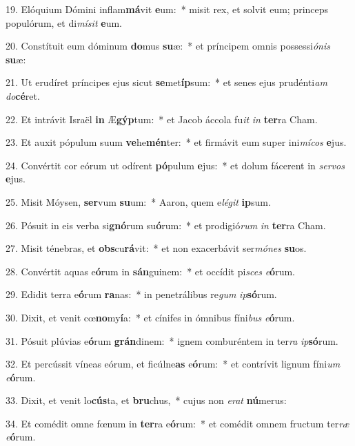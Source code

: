 19. Elóquium Dómini inflam\textbf{má}vit \textbf{e}um:~*  misit rex, et solvit eum; princeps populórum, et di\textit{mí}\textit{sit} \textbf{e}um.\

20. Constítuit eum dóminum \textbf{do}mus \textbf{su}æ:~*  et príncipem omnis possessi\textit{ó}\textit{nis} \textbf{su}æ:\

21. Ut erudíret príncipes ejus sicut \textbf{se}met\textbf{íp}sum:~*  et senes ejus prudénti\textit{am} \textit{do}\textbf{cé}ret.\

22. Et intrávit Israël \textbf{in} Æ\textbf{gýp}tum:~*  et Jacob áccola fu\textit{it} \textit{in} \textbf{ter}ra Cham.\

23. Et auxit pópulum suum \textbf{ve}he\textbf{mén}ter:~*  et firmávit eum super ini\textit{mí}\textit{cos} \textbf{e}jus.\

24. Convértit cor eórum ut odírent \textbf{pó}pulum \textbf{e}jus:~*  et dolum fácerent in \textit{ser}\textit{vos} \textbf{e}jus.\

25. Misit Móysen, \textbf{ser}vum \textbf{su}um:~*  Aaron, quem e\textit{lé}\textit{git} \textbf{ip}sum.\

26. Pósuit in eis verba si\textbf{gnó}rum su\textbf{ó}rum:~*  et prodigió\textit{rum} \textit{in} \textbf{ter}ra Cham.\

27. Misit ténebras, et \textbf{obs}cu\textbf{rá}vit:~*  et non exacerbávit ser\textit{mó}\textit{nes} \textbf{su}os.\

28. Convértit aquas e\textbf{ó}rum in \textbf{sán}guinem:~*  et occídit pi\textit{sces} \textit{e}\textbf{ó}rum.\

29. Edidit terra e\textbf{ó}rum \textbf{ra}nas:~*  in penetrálibus re\textit{gum} \textit{ip}\textbf{só}rum.\

30. Dixit, et venit cœ\textbf{no}my\textbf{í}a:~*  et cínifes in ómnibus fíni\textit{bus} \textit{e}\textbf{ó}rum.\

31. Pósuit plúvias e\textbf{ó}rum \textbf{grán}dinem:~*  ignem comburéntem in ter\textit{ra} \textit{ip}\textbf{só}rum.\

32. Et percússit víneas eórum, et ficúlne\textbf{as} e\textbf{ó}rum:~*  et contrívit lignum fíni\textit{um} \textit{e}\textbf{ó}rum.\

33. Dixit, et venit lo\textbf{cús}ta, et \textbf{bru}chus,~*  cujus non \textit{e}\textit{rat} \textbf{nú}merus:\

34. Et comédit omne fœnum in \textbf{ter}ra e\textbf{ó}rum:~*  et comédit omnem fructum ter\textit{ræ} \textit{e}\textbf{ó}rum.\

